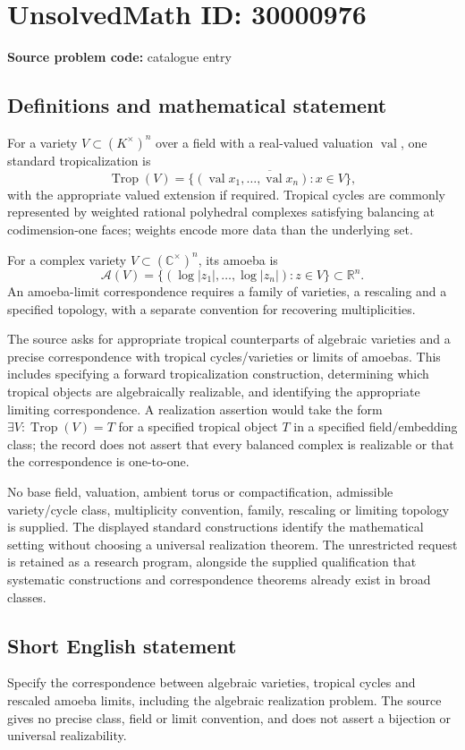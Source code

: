 \documentclass[11pt]{article}
\newcommand{\R}{\mathbb{R}}
\newcommand{\C}{\mathbb{C}}
\begin{document}
\section*{UnsolvedMath ID: 30000976}
\textbf{Source problem code:} catalogue entry
\subsection{Definitions and mathematical statement}
For a variety $V\subset(K^\times)^n$ over a field with a real-valued valuation $\operatorname{val}$, one standard tropicalization is
\[
\operatorname{Trop}(V)=\overline{\{(\operatorname{val}x_1,\ldots,\operatorname{val}x_n):x\in V\}},
\]
with the appropriate valued extension if required. Tropical cycles are commonly represented by weighted rational polyhedral complexes satisfying balancing at codimension-one faces; weights encode more data than the underlying set.

For a complex variety $V\subset(\C^\times)^n$, its amoeba is
\[
\mathcal A(V)=\{(\log|z_1|,\ldots,\log|z_n|):z\in V\}\subset\R^n.
\]
An amoeba-limit correspondence requires a family of varieties, a rescaling and a specified topology, with a separate convention for recovering multiplicities.

The source asks for appropriate tropical counterparts of algebraic varieties and a precise correspondence with tropical cycles/varieties or limits of amoebas. This includes specifying a forward tropicalization construction, determining which tropical objects are algebraically realizable, and identifying the appropriate limiting correspondence. A realization assertion would take the form $\exists V:\operatorname{Trop}(V)=T$ for a specified tropical object $T$ in a specified field/embedding class; the record does not assert that every balanced complex is realizable or that the correspondence is one-to-one.

No base field, valuation, ambient torus or compactification, admissible variety/cycle class, multiplicity convention, family, rescaling or limiting topology is supplied. The displayed standard constructions identify the mathematical setting without choosing a universal realization theorem. The unrestricted request is retained as a research program, alongside the supplied qualification that systematic constructions and correspondence theorems already exist in broad classes.
\subsection{Short English statement}
Specify the correspondence between algebraic varieties, tropical cycles and rescaled amoeba limits, including the algebraic realization problem. The source gives no precise class, field or limit convention, and does not assert a bijection or universal realizability.
\end{document}
